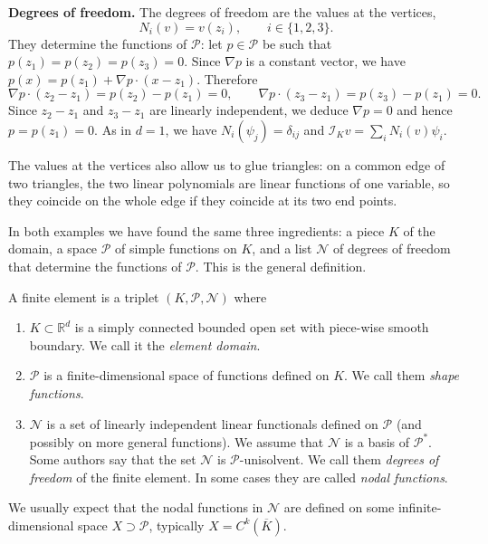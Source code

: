 \begin{example}[The linear Lagrange triangle in $d = 2$]
    \medskip
    \noindent\textbf{Degrees of freedom.}
    The degrees of freedom are the values at the vertices,
    \begin{equation*}
        N_i(v) = v(z_i), \qquad i \in \{1, 2, 3\}.
    \end{equation*}
    They determine the functions of $\mathcal P$: let $p \in \mathcal P$ be such that $p(z_1) = p(z_2) = p(z_3) = 0$.
    Since $\nabla p$ is a constant vector, we have $p(x) = p(z_1) + \nabla p \cdot (x - z_1)$. Therefore
    \begin{equation*}
        \nabla p \cdot (z_2 - z_1) = p(z_2) - p(z_1) = 0, \qquad \nabla p \cdot (z_3 - z_1) = p(z_3) - p(z_1) = 0.
    \end{equation*}
    Since $z_2 - z_1$ and $z_3 - z_1$ are linearly independent, we deduce $\nabla p = 0$ and hence $p = p(z_1) = 0$.
    As in $d = 1$, we have $N_i(\psi_j) = \delta_{ij}$ and $\mathcal I_K v = \sum_{i} N_i(v) \psi_i$.

    The values at the vertices also allow us to glue triangles: on a common edge of two triangles, the two linear polynomials are linear functions of one variable, so they coincide on the whole edge if they coincide at its two end points.
\end{example}

In both examples we have found the same three ingredients: a piece $K$ of the domain, a space $\mathcal P$ of simple functions on $K$, and a list $\mathcal N$ of degrees of freedom that determine the functions of $\mathcal P$.
This is the general definition.

\begin{definition}
    A finite element is a triplet $(K, \mathcal P, \mathcal N)$ where
    \begin{enumerate}
        \item $K \subset \mathbb R^d$ is a simply connected bounded open set with piece-wise smooth boundary. We call it the \emph{element domain}.
        \item $\mathcal P$ is a finite-dimensional space of functions defined on $K$. We call them \emph{shape functions}.
        \item $\mathcal N$ is a set of linearly independent linear functionals defined on $\mathcal P$ (and possibly on more general functions).
              We assume that $\mathcal N$ is a basis of $\mathcal P^*$.
              Some authors say that the set $\mathcal N$ is $\mathcal P$-unisolvent.
              We call them \emph{degrees of freedom} of the finite element.
              In some cases they are called \emph{nodal functions}.
    \end{enumerate}
\end{definition}
We usually expect that the nodal functions in $\mathcal N$ are defined on some infinite-dimensional space $X \supset \mathcal P$, typically $X = C^k(\overline K)$.

